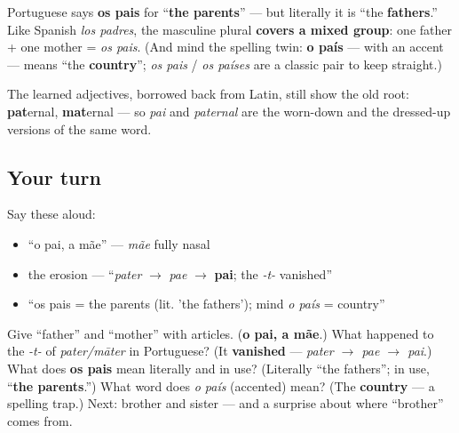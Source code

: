 \begin{grammarlens}[title={Grammar Lens: The plural trick — os pais}]
Portuguese says \textbf{os pais} for \textquotedblleft{}\textbf{the parents}\textquotedblright{} — but literally it is \textquotedblleft{}the \textbf{fathers}.\textquotedblright{} Like Spanish \emph{los padres}, the masculine plural \textbf{covers a mixed group}: one father + one mother = \emph{os pais}. (And mind the spelling twin: \textbf{o país} — with an accent — means \textquotedblleft{}the \textbf{country}\textquotedblright{}; \emph{os pais} / \emph{os países} are a classic pair to keep straight.)

The learned adjectives, borrowed back from Latin, still show the old root: \textbf{pat}ernal, \textbf{mat}ernal — so \emph{pai} and \emph{paternal} are the worn-down and the dressed-up versions of the same word.
\end{grammarlens}

\subsection*{Your turn}
Say these aloud:

\begin{itemize}
\raggedright
  \item \textquotedblleft{}o pai, a mãe\textquotedblright{} — \emph{mãe} fully nasal
  \item the erosion — \textquotedblleft{}\emph{pater} $\to$ \emph{pae} $\to$ \textbf{pai}; the \emph{-t-} vanished\textquotedblright{}
  \item \textquotedblleft{}os pais = the parents (lit. 'the fathers'); mind \emph{o país} = country\textquotedblright{}
\end{itemize}

\begin{tcolorbox}[breakable,colback=teal!4,colframe=teal!35!black,title={Before you move on}]
Give \textquotedblleft{}father\textquotedblright{} and \textquotedblleft{}mother\textquotedblright{} with articles. (\textbf{o pai, a mãe}.) What happened to the \emph{-t-} of \emph{pater/māter} in Portuguese? (It \textbf{vanished} — \emph{pater $\to$ pae $\to$ pai}.) What does \textbf{os pais} mean literally and in use? (Literally \textquotedblleft{}the fathers\textquotedblright{}; in use, \textquotedblleft{}\textbf{the parents}.\textquotedblright{}) What word does \emph{o país} (accented) mean? (The \textbf{country} — a spelling trap.) Next: brother and sister — and a surprise about where \textquotedblleft{}brother\textquotedblright{} comes from.
\end{tcolorbox}
